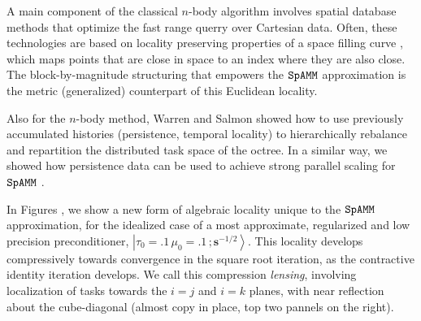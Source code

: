 \documentclass[letterpaper,twocolumn,amsmath,amsfont,amssymb,english,aps,jcp,preprintnumbers,groupaddress,nofootinbib,tightenlines,floatfix]{revtex4}
\newcommand{\mat}[1]{\boldsymbol{#1}}
\theoremstyle{plain}
\theoremstyle{remark}
\theoremstyle{plain}
\begin{document}
A main component of the classical $n$-body algorithm involves spatial database methods that 
optimize the fast range querry over Cartesian data.  Often, these technologies are
based on locality preserving properties of a space filling curve \cite{}, which maps points that are
close in space to an index where they are also close.  The block-by-magnitude structuring that empowers 
the $\tt SpAMM$ approximation is the metric (generalized) counterpart of this Euclidean locality.

Also for the $n$-body method,  Warren and Salmon showed how to use previously accumulated histories 
(persistence, temporal locality) to hierarchically rebalance and repartition  the distributed task space of the octree. 
In a similar way, we showed how persistence data can be used to achieve strong parallel scaling for $\tt SpAMM$ \cite{}.  

In Figures , we show a new form of algebraic locality unique to the $\tt SpAMM$ approximation, 
for the idealized case of a most approximate, regularized and low precision preconditioner, $\left|\tau_0=.1\,\mu_0=.1\, ; \scriptstyle{\mat{s}^{-1/2}} \right>$.
This locality develops compressively towards convergence in the square root iteration, as the contractive identity iteration develops.  
We call this compression {\em lensing},  involving localization of tasks towards the $i=j$ and $i=k$ planes,
with near reflection about the cube-diagonal (almost copy in place, top two pannels on the right).  
\end{document}
